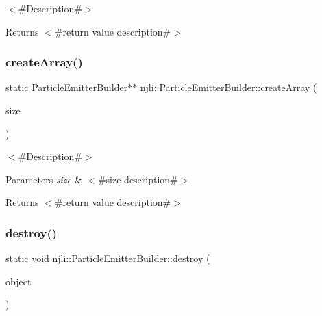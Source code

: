 $<$\#\+Description\#$>$

\begin{DoxyReturn}{Returns}
$<$\#return value description\#$>$ 
\end{DoxyReturn}
\mbox{\label{classnjli_1_1_particle_emitter_builder_a80b3c1b4e4f7ffb338f58ca24bdad33c}} 
\subsubsection{\texorpdfstring{create\+Array()}{createArray()}}
{\footnotesize\ttfamily static \mbox{\hyperlink{classnjli_1_1_particle_emitter_builder}{Particle\+Emitter\+Builder}}$\ast$$\ast$ njli\+::\+Particle\+Emitter\+Builder\+::create\+Array (\begin{DoxyParamCaption}\item[{const \mbox{\hyperlink{_util_8h_a10e94b422ef0c20dcdec20d31a1f5049}{u32}}}]{size }\end{DoxyParamCaption})\hspace{0.3cm}{\ttfamily [static]}}

$<$\#\+Description\#$>$


\begin{DoxyParams}{Parameters}
{\em size} & $<$\#size description\#$>$\\
\hline
\end{DoxyParams}
\begin{DoxyReturn}{Returns}
$<$\#return value description\#$>$ 
\end{DoxyReturn}
\mbox{\label{classnjli_1_1_particle_emitter_builder_ad78bd0dfc56c6f70f76139887f4f2e4e}} 
\subsubsection{\texorpdfstring{destroy()}{destroy()}}
{\footnotesize\ttfamily static \mbox{\hyperlink{_thread_8h_af1e856da2e658414cb2456cb6f7ebc66}{void}} njli\+::\+Particle\+Emitter\+Builder\+::destroy (\begin{DoxyParamCaption}\item[{\mbox{\hyperlink{classnjli_1_1_particle_emitter_builder}{Particle\+Emitter\+Builder}} $\ast$}]{object }\end{DoxyParamCaption})\hspace{0.3cm}{\ttfamily [static]}}


